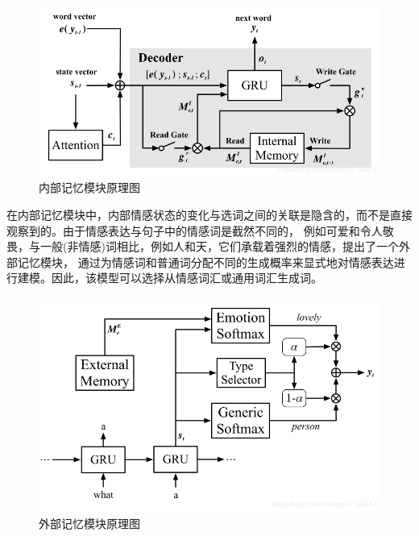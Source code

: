 \documentclass[supercite]{HustGraduPaper}
\theoremstyle{definition}
\begin{document}
\begin{figure}[H] %
  \centering %
  \includegraphics[width=1\textwidth]{images/imemory.png} %
  \caption{内部记忆模块原理图} %
  \label{Fig.imemory} %
\end{figure}

在内部记忆模块中，内部情感状态的变化与选词之间的关联是隐含的，而不是直接观察到的。由于情感表达与句子中的情感词是截然不同的，
例如可爱和令人敬畏，与一般(非情感)词相比，例如人和天，它们承载着强烈的情感，提出了一个外部记忆模块，
通过为情感词和普通词分配不同的生成概率来显式地对情感表达进行建模。因此，该模型可以选择从情感词汇或通用词汇生成词。

\begin{figure}[H] %
  \centering %
  \includegraphics[width=1\textwidth]{images/ememory.png} %
  \caption{外部记忆模块原理图} %
  \label{Fig.ememory} %
\end{figure}
\end{document}
